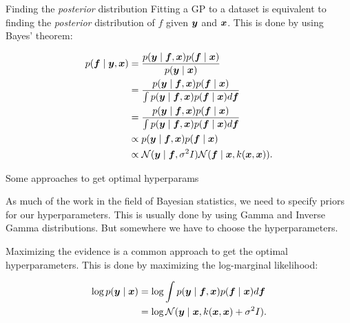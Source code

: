 \documentclass[xcolor=dvipsnames,t,aspectratio=169]{beamer} %
\newcommand{\highlight}[1]{{\color{fgv_light_blue} #1}}
\begin{document}
\begin{frame}[c]{Finding the \highlight{\textit{posterior} distribution}}
    Fitting a GP to a dataset is equivalent to finding the \highlight{\textit{posterior} distribution} of $f$ given $\boldsymbol{y}$ and $\boldsymbol{x}$. This is done by using \highlight{Bayes' theorem}:

    \begin{align*}
        p(\boldsymbol{f} \mid \boldsymbol{y}, \boldsymbol{x}) &= \frac{p(\boldsymbol{y} \mid \boldsymbol{f}, \boldsymbol{x}) p(\boldsymbol{f} \mid \boldsymbol{x})}{p(\boldsymbol{y} \mid \boldsymbol{x})}\\
        &= \frac{p(\boldsymbol{y} \mid \boldsymbol{f}, \boldsymbol{x}) p(\boldsymbol{f} \mid \boldsymbol{x})}{\int p(\boldsymbol{y} \mid \boldsymbol{f}, \boldsymbol{x}) p(\boldsymbol{f} \mid \boldsymbol{x}) d\boldsymbol{f}}\\
        &= \frac{p(\boldsymbol{y} \mid \boldsymbol{f}, \boldsymbol{x}) p(\boldsymbol{f} \mid \boldsymbol{x})}{\int p(\boldsymbol{y} \mid \boldsymbol{f}, \boldsymbol{x}) p(\boldsymbol{f} \mid \boldsymbol{x}) d\boldsymbol{f}}\\
        &\propto p(\boldsymbol{y} \mid \boldsymbol{f}, \boldsymbol{x}) p(\boldsymbol{f} \mid \boldsymbol{x})\\
        &\propto \mathcal{N}(\boldsymbol{y} \mid \boldsymbol{f}, \sigma^2 I) \mathcal{N}(\boldsymbol{f} \mid \boldsymbol{x}, k(\boldsymbol{x}, \boldsymbol{x})).
    \end{align*}
\end{frame}

\begin{frame}[c]{Some \highlight{approaches} to get \highlight{optimal} hyperparams}

    As much of the work in the field of Bayesian statistics, we need to specify \highlight{priors} for our hyperparameters. This is usually done by using \highlight{Gamma} and \highlight{Inverse Gamma} distributions. But somewhere we have to choose the \highlight{hyperparameters}.

    Maximizing the evidence is a common approach to get the \highlight{optimal} hyperparameters. This is done by maximizing the \highlight{log-marginal likelihood}:

    \begin{align*}
        \log p(\boldsymbol{y} \mid \boldsymbol{x}) &= \log \int p(\boldsymbol{y} \mid \boldsymbol{f}, \boldsymbol{x}) p(\boldsymbol{f} \mid \boldsymbol{x}) d\boldsymbol{f}\\
        &= \log \mathcal{N}(\boldsymbol{y} \mid \boldsymbol{x}, k(\boldsymbol{x}, \boldsymbol{x}) + \sigma^2 I).
    \end{align*}

    
\end{frame}
\end{document}
